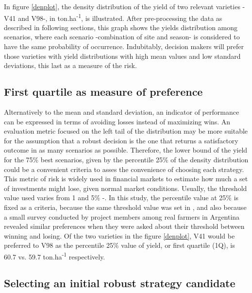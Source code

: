 \documentclass[syngen,nonblindrev]{informs3-syngen}
\begin{document}
In figure \ref{denplot}, the density distribution of the yield of two relevant varieties -V41 and V98-, in ton.ha\textsuperscript{-1}, is illustrated. 
After pre-processing the data as described in following sections, this graph shows the yields distribution among scenarios, where each scenario -combination of site and season- is considered to have the same probability of occurrence. 
Indubitably, decision makers will prefer those varieties with yield distributions with high mean values and low standard deviations, this last as a measure of the risk. 

\subsection{First quartile as measure of preference}
Alternatively to the mean and standard deviation, an indicator of performance can be expressed in terms of avoiding losses instead of maximizing wins. 
An evaluation metric focused on the left tail of the distribution may be more suitable for the assumption that a robust decision is the one that returns a satisfactory outcome in as many scenarios as possible. 
Therefore, the lower bound of the yield for the 75\% best scenarios, given by the percentile 25\% of the density distribution could be a convenient criteria to asses the convenience of choosing each strategy. 
This metric of risk is widely used in financial markets to estimate how much a set of investments might lose, given normal market conditions. Usually, the threshold value used varies from 1 and 5\%  -\cite {linsmeier2000value}. 
In this study, the percentile value at 25\% is fixed as a criteria, because the same threshold value was set in \cite {lempert2006general}, and also because a small survey conducted by project members among real farmers in Argentina revealed similar preferences when they were asked about their threshold between winning and losing. 
Of the two varieties in the figure \ref{denplot}, V41 would be preferred to V98 as the percentile 25\% value of yield, or first quartile (1Q), is 60.7 vs. 59.7 ton.ha\textsuperscript{-1} respectively.

\subsection{Selecting an initial robust strategy candidate}
\end{document}
